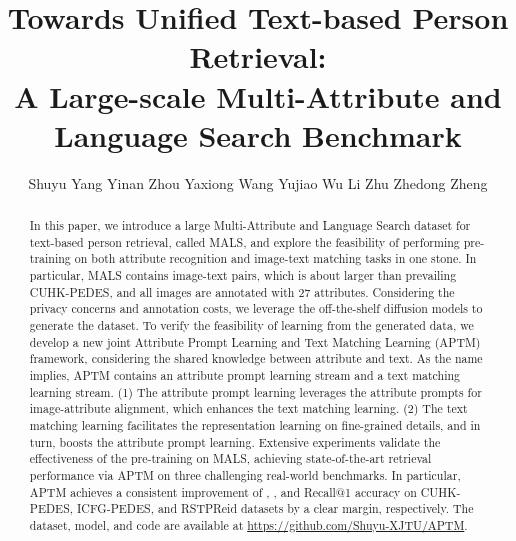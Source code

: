 \documentclass[sigconf]{acmart}
\begin{document}
\title{ Towards Unified Text-based Person Retrieval: \\ 
A Large-scale Multi-Attribute and Language Search Benchmark}


\author{  
Shuyu Yang \quad Yinan Zhou \quad Yaxiong Wang \quad Yujiao Wu \quad Li Zhu \quad Zhedong Zheng}

\renewcommand{\shortauthors}{Shuyu Yang et al.}

\renewcommand{\thefootnote}{\fnsymbol{footnote}}
\begin{abstract}
In this paper, we introduce a large Multi-Attribute and Language Search dataset for text-based person retrieval, called MALS, and explore the feasibility of performing pre-training on both attribute recognition and image-text matching tasks in one stone. 
In particular, MALS contains  image-text pairs, which is about  larger than prevailing CUHK-PEDES, and all images are annotated with 27 attributes. 
Considering the privacy concerns and annotation costs, we leverage the off-the-shelf diffusion models to generate the dataset.
To verify the feasibility of learning from the generated data, we develop a new joint Attribute Prompt Learning and Text Matching Learning (APTM) framework, considering the shared knowledge between attribute and text.
As the name implies, APTM contains an attribute prompt learning stream and a text matching learning stream. 
(1) The attribute prompt learning leverages the attribute prompts for image-attribute alignment, which enhances the text matching learning.
(2) The text matching learning facilitates the representation learning on fine-grained details, and in turn, boosts the attribute prompt learning.
Extensive experiments validate the effectiveness of the pre-training on MALS, achieving state-of-the-art retrieval performance via APTM on three challenging real-world benchmarks. 
In particular, APTM achieves a consistent improvement of , , and  Recall@1 accuracy on CUHK-PEDES, ICFG-PEDES, and RSTPReid datasets by a clear margin, respectively. 
The dataset, model, and code are available at \url{https://github.com/Shuyu-XJTU/APTM}. 
\end{abstract} 
\end{document}
